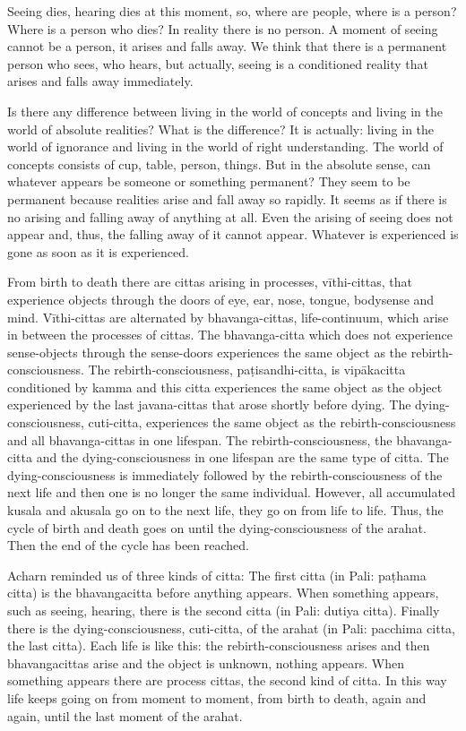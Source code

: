 Seeing dies, hearing dies at this moment, so, where are people, where is
a person? Where is a person who dies? In reality there is no person. A
moment of seeing cannot be a person, it arises and falls away. We think
that there is a permanent person who sees, who hears, but actually,
seeing is a conditioned reality that arises and falls away immediately.

Is there any difference between living in the world of concepts and
living in the world of absolute realities? What is the difference? It is
actually: living in the world of ignorance and living in the world of
right understanding. The world of concepts consists of cup, table,
person, things. But in the absolute sense, can whatever appears be
someone or something permanent? They seem to be permanent because
realities arise and fall away so rapidly. It seems as if there is no
arising and falling away of anything at all. Even the arising of seeing
does not appear and, thus, the falling away of it cannot appear.
Whatever is experienced is gone as soon as it is experienced.

From birth to death there are cittas arising in processes, vīthi-cittas,
that experience objects through the doors of eye, ear, nose, tongue,
bodysense and mind. Vīthi-cittas are alternated by bhavanga-cittas,
life-continuum, which arise in between the processes of cittas. The
bhavanga-citta which does not experience sense-objects through the
sense-doors experiences the same object as the rebirth-consciousness.
The rebirth-consciousness, paṭisandhi-citta, is vipākacitta conditioned
by kamma and this citta experiences the same object as the object
experienced by the last javana-cittas that arose shortly before dying.
The dying-consciousness, cuti-citta, experiences the same object as the
rebirth-consciousness and all bhavanga-cittas in one lifespan. The
rebirth-consciousness, the bhavanga-citta and the dying-consciousness in
one lifespan are the same type of citta. The dying-consciousness is
immediately followed by the rebirth-consciousness of the next life and
then one is no longer the same individual. However, all accumulated
kusala and akusala go on to the next life, they go on from life to life.
Thus, the cycle of birth and death goes on until the dying-consciousness
of the arahat. Then the end of the cycle has been reached.

Acharn reminded us of three kinds of citta: The first citta (in Pali:
paṭhama citta) is the bhavangacitta before anything appears. When
something appears, such as seeing, hearing, there is the second citta
(in Pali: dutiya citta). Finally there is the dying-consciousness,
cuti-citta, of the arahat (in Pali: pacchima citta, the last citta).
Each life is like this: the rebirth-consciousness arises and then
bhavangacittas arise and the object is unknown, nothing appears. When
something appears there are process cittas, the second kind of citta. In
this way life keeps going on from moment to moment, from birth to death,
again and again, until the last moment of the arahat.

